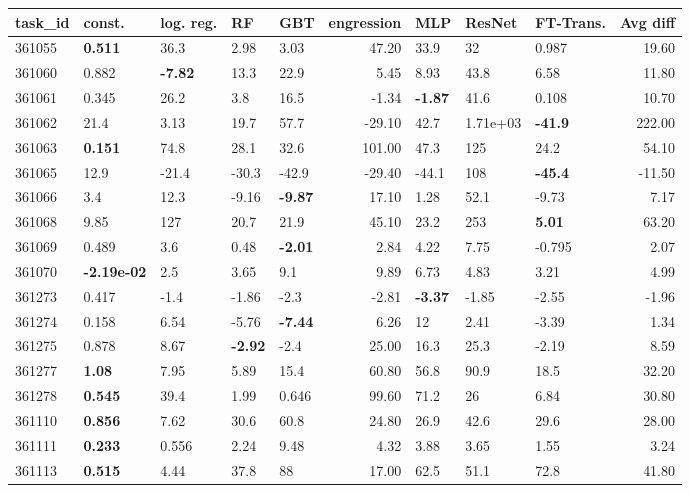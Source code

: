 \begin{table}[ht!]
\centering
\begingroup\footnotesize
\begin{tabular}{lllllrlllr}
  \hline
\hline
task\_id & const. & log. reg. & RF & GBT & engression & MLP & ResNet & FT-Trans. & Avg diff \\ 
  \hline
361055 & \textbf{0.511} & 36.3 & 2.98 & 3.03 & 47.20 & 33.9 & 32 & 0.987 & 19.60 \\ 
  361060 & 0.882 & \textbf{-7.82} & 13.3 & 22.9 & 5.45 & 8.93 & 43.8 & 6.58 & 11.80 \\ 
  361061 & 0.345 & 26.2 & 3.8 & 16.5 & -1.34 & \textbf{-1.87} & 41.6 & 0.108 & 10.70 \\ 
  361062 & 21.4 & 3.13 & 19.7 & 57.7 & -29.10 & 42.7 &  1.71e+03 & \textbf{-41.9} & 222.00 \\ 
  361063 & \textbf{0.151} & 74.8 & 28.1 & 32.6 & 101.00 & 47.3 & 125 & 24.2 & 54.10 \\ 
  361065 & 12.9 & -21.4 & -30.3 & -42.9 & -29.40 & -44.1 & 108 & \textbf{-45.4} & -11.50 \\ 
  361066 & 3.4 & 12.3 & -9.16 & \textbf{-9.87} & 17.10 & 1.28 & 52.1 & -9.73 & 7.17 \\ 
  361068 & 9.85 & 127 & 20.7 & 21.9 & 45.10 & 23.2 & 253 & \textbf{5.01} & 63.20 \\ 
  361069 & 0.489 & 3.6 & 0.48 & \textbf{-2.01} & 2.84 & 4.22 & 7.75 & -0.795 & 2.07 \\ 
  361070 & \textbf{-2.19e-02} & 2.5 & 3.65 & 9.1 & 9.89 & 6.73 & 4.83 & 3.21 & 4.99 \\ 
  361273 & 0.417 & -1.4 & -1.86 & -2.3 & -2.81 & \textbf{-3.37} & -1.85 & -2.55 & -1.96 \\ 
  361274 & 0.158 & 6.54 & -5.76 & \textbf{-7.44} & 6.26 & 12 & 2.41 & -3.39 & 1.34 \\ 
  361275 & 0.878 & 8.67 & \textbf{-2.92} & -2.4 & 25.00 & 16.3 & 25.3 & -2.19 & 8.59 \\ 
  361277 & \textbf{1.08} & 7.95 & 5.89 & 15.4 & 60.80 & 56.8 & 90.9 & 18.5 & 32.20 \\ 
  361278 & \textbf{0.545} & 39.4 & 1.99 & 0.646 & 99.60 & 71.2 & 26 & 6.84 & 30.80 \\ 
  361110 & \textbf{0.856} & 7.62 & 30.6 & 60.8 & 24.80 & 26.9 & 42.6 & 29.6 & 28.00 \\ 
  361111 & \textbf{0.233} & 0.556 & 2.24 & 9.48 & 4.32 & 3.88 & 3.65 & 1.55 & 3.24 \\ 
  361113 & \textbf{0.515} & 4.44 & 37.8 & 88 & 17.00 & 62.5 & 51.1 & 72.8 & 41.80 \\ 

\end{tabular}
\end{table}
